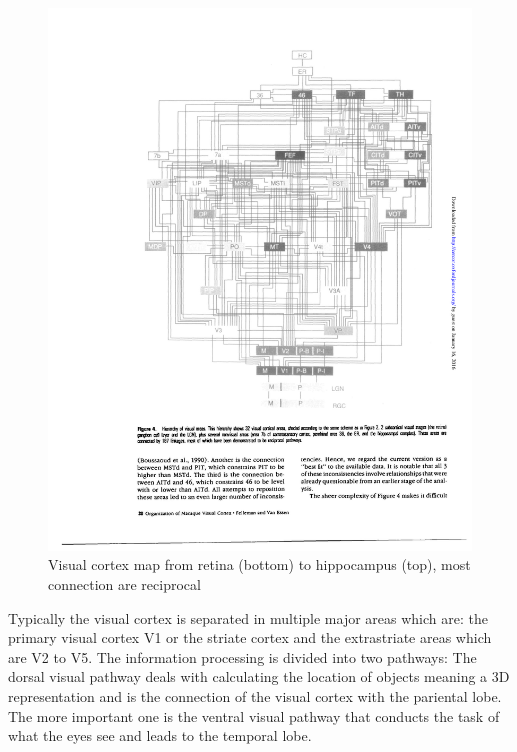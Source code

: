 		\begin{figure}[H]
			\centering
			\captionsetup{justification=centering,margin=0.5cm}
			\includegraphics[width=\textwidth, trim=5cm 7cm 2cm 2cm, clip]{images/visual-cortex-map.pdf}
			\caption{Visual cortex map from retina (bottom) to hippocampus (top), most connection are reciprocal \citep{felleman1991distributed}}
			\label{cortex-map}
		\end{figure}
		
		Typically the visual cortex is separated in multiple major areas which are: the primary visual cortex V1 or the striate cortex and the extrastriate areas which are V2 to V5. The information processing is divided into two pathways: The dorsal visual pathway deals with calculating the location of objects meaning a 3D representation and is the connection of the visual cortex with the pariental lobe. The more important one is the ventral visual pathway that conducts the task of what the eyes see and leads to the temporal lobe.
		

